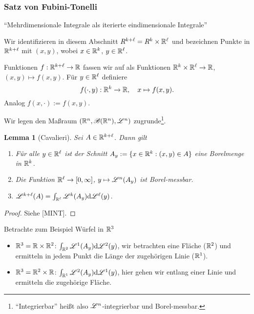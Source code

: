 \documentclass[
 a4paper,
 12pt,
 parskip=half
 ]{scrartcl}
\theoremstyle{plain}
\newtheorem*{lem*}{Lemma}
\theoremstyle{definition}
\numberwithin{equation}{section}
\begin{document}
\subsubsection{Satz von Fubini-Tonelli}\label{sect:tonelli}
``Mehrdimensionale Integrale als iterierte eindimensionale Integrale''

Wir identifizieren in diesem Abschnitt $R^{k+\ell} = R^k \times \mathbb{R}^\ell$ und bezeichnen Punkte in $\mathbb{R}^{k + \ell}$ mit $(x,y)$, wobei $x \in \mathbb{R}^k$, $y \in \mathbb{R}^\ell$.

Funktionen $f: \mathbb{R}^{k+\ell} \to \mathbb{R}$ fassen wir auf als Funktionen $\mathbb{R}^k \times \mathbb{R}^\ell \to \mathbb{R}$, $(x,y) \mapsto f(x,y)$. Für $y \in \mathbb{R}^\ell$ definiere 
\[ f( \cdot, y ) : \mathbb{R}^k \to \mathbb{R}, \quad x \mapsto f(x,y). \]
Analog $f( x, \cdot ) := f(x,y)$.

Wir legen den Maßraum $(\mathbb{R}^n, \mathscr{B}(\mathbb{R}^n), \mathscr{L}^n)$ zugrunde\footnote{``Integrierbar'' heißt also $\mathscr{L}^n$-integrierbar und Borel-messbar.}.

\begin{lem*}[Cavalieri]
Sei $A \in \mathbb{R}^{k+\ell}$. Dann gilt
\begin{enumerate}
 \item Für alle $y \in \mathbb{R}^\ell$ ist der Schnitt $A_y := \{ x \in \mathbb{R}^k : (x,y) \in A \}$ eine Borelmenge in $\mathbb{R}^k$.
 \item Die Funktion $\mathbb{R}^\ell \to [0,\infty]$, $y \mapsto \mathscr{L}^n(A_y)$ ist Borel-messbar.
 \item $\mathscr{L}^{k+\ell} (A) = \int_{\mathbb{R}^\ell} \mathscr{L}^k (A_y) \mathrm{d} \mathscr{L}^\ell(y)$.
\end{enumerate}
\end{lem*}

\begin{proof}
 Siehe [MINT].
\end{proof}

Betrachte zum Beispiel Würfel in $\mathbb{R}^3$
\begin{itemize}
 \item $\mathbb{R}^3 = \mathbb{R} \times \mathbb{R}^2$: $\int_{\mathbb{R}^2} \mathscr{L}^1 (A_y) \mathrm{d} \mathscr{L}^2(y)$, wir betrachten eine Fläche ($\mathbb{R}^2$) und ermitteln in jedem Punkt die Länge der zugehörigen Linie ($\mathbb{R}^1$).
 \item $\mathbb{R}^3 = \mathbb{R}^2 \times \mathbb{R}$: $\int_{\mathbb{R}^1} \mathscr{L}^2 (A_y) \mathrm{d} \mathscr{L}^1(y)$, hier gehen wir entlang einer Linie und ermitteln die zugehörige Fläche.
\end{itemize}
\end{document}
